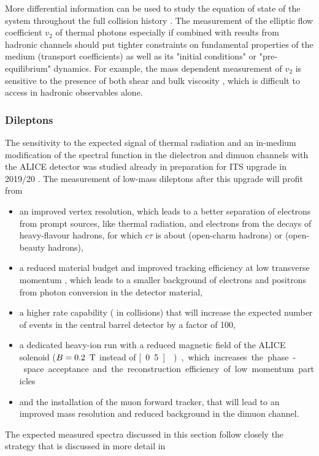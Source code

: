 \documentclass[../report.tex]{subfiles}
\begin{document}
More differential information can be used to study the equation of state of the system throughout the full collision history \cite{Vujanovic:2016anq}. The measurement of the elliptic flow coefficient $v_2$ of thermal photons especially if combined with results from hadronic channels should put tighter constraints on fundamental properties of the medium (\eg transport coefficients) as well as its "initial conditions" or "pre-equilibrium" dynamics. For example, the mass dependent measurement of  $v_2$ is sensitive to the presence of both shear \cite{Vujanovic:2017psb} and bulk viscosity \cite{Vujanovic:2017wtw}, which is difficult to access in hadronic observables alone. 





\subsubsection{Dileptons}
\label{sec:thermalradiation:dileptons}

The sensitivity to the expected signal of thermal radiation and an in-medium modification of the \PGr spectral function in the dielectron and dimuon channels with the ALICE detector \cite{Aamodt:2008zz,Abelev:2014ffa} was studied already in preparation for ITS upgrade in 2019/20 \cite{Abelevetal:2014cna,Abelevetal:2014dna,ALICE:2014qrd,ALICE:MFTLoI}. The measurement of low-mass dileptons after this upgrade will profit from  
\begin{itemize}
\item an improved vertex resolution, which leads to a better separation of electrons from prompt sources, like thermal radiation, and electrons from the decays of heavy-flavour hadrons, for which $c\tau$ is about \unit[150]{\Uum} (open-charm hadrons) or \unit[400]{\Uum} (open-beauty hadrons), 
\item a reduced material budget and improved tracking efficiency at low transverse momentum \pT, which leads to a smaller background of electrons and positrons from photon conversion in the detector material,
\item a higher rate capability (\unit[50]{\UkHz} in \PbPb{} collisions) that will increase the expected number of events in the central barrel detector by a factor of 100, 
\item a dedicated heavy-ion run with a reduced magnetic field of the ALICE solenoid ($B=\unit[0.2]{\UT}$ instead of \unit[0.5]{\UT}), which increases the phase-space acceptance and the reconstruction efficiency of low momentum particles 
\item and the installation of the muon forward tracker, that will lead to an improved mass resolution and reduced background in the dimuon channel.
\end{itemize}
The expected measured spectra discussed in this section follow closely the strategy that is discussed in more detail in \cite{Abelevetal:2014cna,Abelevetal:2014dna,ALICE:2014qrd,ALICE:MFTLoI}
\end{document}
